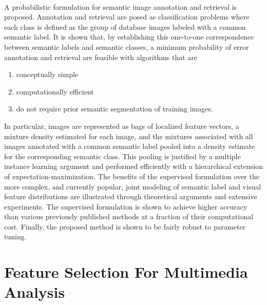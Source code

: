 \documentclass[a4paper,11pt]{report}
\begin{document}
\paragraph{}
A probabilistic formulation for semantic image annotation and retrieval is proposed. Annotation and retrieval are posed as classification problems where each class is defined as the group of database images labeled with a common semantic label. It is shown that, by establishing this one-to-one correspondence between semantic labels and semantic classes, a minimum probability of error annotation and retrieval are feasible with algorithms that are 
\begin{enumerate}


\item conceptually simple
\item computationally efficient
\item do not require prior semantic segmentation of training images.
\end{enumerate}
 In particular, images are represented as bags of localized feature vectors, a mixture density estimated for each image, and the mixtures associated with all images annotated with a common semantic label pooled into a density estimate for the corresponding semantic class. This pooling is justified by a multiple instance learning argument and performed efficiently with a hierarchical extension of expectation-maximization. The benefits of the supervised formulation over the more complex, and currently popular, joint modeling of semantic label and visual feature distributions are illustrated through theoretical arguments and extensive experiments. The supervised formulation is shown to achieve higher accuracy than various previously published methods at a fraction of their computational cost. Finally, the proposed method is shown to be fairly robust to parameter tuning.

\section{Feature  Selection  For  Multimedia Analysis}
\end{document}
